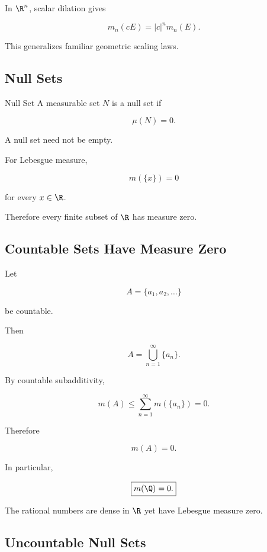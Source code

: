 In \(\R^n\), scalar dilation gives

\[
\boxed{
m_n(cE)
=
|c|^n m_n(E).
}
\]

This generalizes familiar geometric scaling laws.

\subsection{Null Sets}
\label{subsec:null-sets}

\begin{definitionbox}{Null Set}
A measurable set \(N\) is a null set if

\[
\boxed{
\mu(N)=0.
}
\]
\end{definitionbox}

A null set need not be empty.

For Lebesgue measure,

\[
\boxed{
m(\{x\})=0
}
\]

for every \(x\in\R\).

Therefore every finite subset of \(\R\) has measure zero.

\subsection{Countable Sets Have Measure Zero}
\label{subsec:countable-null-sets}

Let

\[
A=\{a_1,a_2,\ldots\}
\]

be countable.

Then

\[
A=
\bigcup_{n=1}^{\infty}\{a_n\}.
\]

By countable subadditivity,

\[
m(A)
\leq
\sum_{n=1}^{\infty}m(\{a_n\})
=
0.
\]

Therefore

\[
\boxed{
m(A)=0.
}
\]

In particular,

\[
\boxed{
m(\Q)=0.
}
\]

The rational numbers are dense in \(\R\) yet have Lebesgue measure zero.

\subsection{Uncountable Null Sets}
\label{subsec:uncountable-null-sets}

